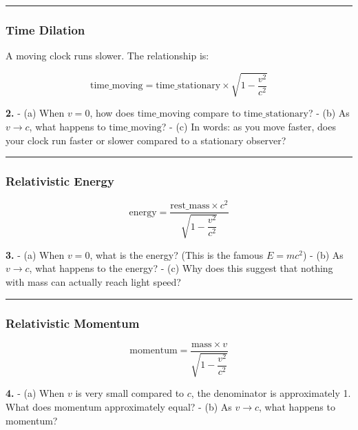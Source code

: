 \documentclass[
  11pt,
]{article}
\begin{document}
\begin{center}\rule{0.5\linewidth}{0.5pt}\end{center}

\hypertarget{time-dilation}{%
\subsubsection{Time Dilation}\label{time-dilation}}

A moving clock runs slower. The relationship is:

\[\text{time\_moving} = \text{time\_stationary} \times \sqrt{1 - \dfrac{v^2}{c^2}}\]

\textbf{2.} - (a) When \(v = 0\), how does \(\text{time\_moving}\)
compare to \(\text{time\_stationary}\)? - (b) As \(v \to c\), what
happens to \(\text{time\_moving}\)? - (c) In words: as you move faster,
does your clock run faster or slower compared to a stationary observer?

\begin{center}\rule{0.5\linewidth}{0.5pt}\end{center}

\hypertarget{relativistic-energy}{%
\subsubsection{Relativistic Energy}\label{relativistic-energy}}

\[\text{energy} = \dfrac{\text{rest\_mass} \times c^2}{\sqrt{1 - \dfrac{v^2}{c^2}}}\]

\textbf{3.} - (a) When \(v = 0\), what is the energy? (This is the
famous \(E = mc^2\)) - (b) As \(v \to c\), what happens to the energy? -
(c) Why does this suggest that nothing with mass can actually reach
light speed?

\begin{center}\rule{0.5\linewidth}{0.5pt}\end{center}

\hypertarget{relativistic-momentum}{%
\subsubsection{Relativistic Momentum}\label{relativistic-momentum}}

\[\text{momentum} = \dfrac{\text{mass} \times v}{\sqrt{1 - \dfrac{v^2}{c^2}}}\]

\textbf{4.} - (a) When \(v\) is very small compared to \(c\), the
denominator is approximately 1. What does momentum approximately equal?
- (b) As \(v \to c\), what happens to momentum?
\end{document}
